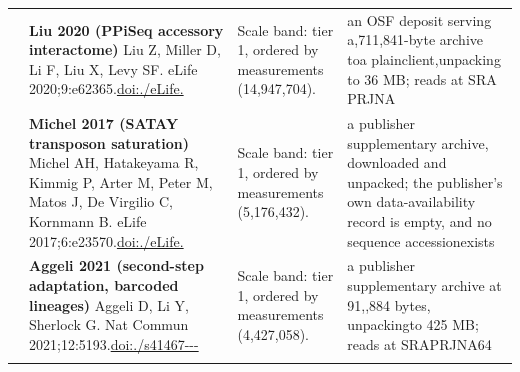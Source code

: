 \begin{landscape}
\begin{longtable}{@{}r@{\hspace{4pt}} L{78mm} L{72mm} L{76mm}@{}}
 & \textbf{Liu 2020 (PPiSeq accessory interactome)} \newline Liu Z, Miller D, Li F, Liu X, Levy SF. eLife 2020;9:e62365.\newline \href{https://doi.org/10.7554/eLife.62365}{doi:./\allowbreak eLife.} & Scale band: tier 1, ordered by measurements (14,947,704). & an OSF d\allowbreak eposit s\allowbreak erving a,711\allowbreak ,841-\allowbreak byte ar\allowbreak chive to\allowbreak  a plain\allowbreak  client,\allowbreak  unpacki\allowbreak ng to 36 MB; re\allowbreak ads at S\allowbreak RA PRJNA \\
 & \textbf{Michel 2017 (SATAY transposon saturation)} \newline Michel AH, Hatakeyama R, Kimmig P, Arter M, Peter M, Matos J, De Virgilio C, Kornmann B. eLife 2017;6:e23570.\newline \href{https://doi.org/10.7554/eLife.23570}{doi:./\allowbreak eLife.} & Scale band: tier 1, ordered by measurements (5,176,432). & a publis\allowbreak her supp\allowbreak lementar\allowbreak y archiv\allowbreak e, downl\allowbreak oaded an\allowbreak d unpack\allowbreak ed; the \allowbreak publishe\allowbreak r's own \allowbreak data-\allowbreak availab\allowbreak ility re\allowbreak cord is \allowbreak empty, a\allowbreak nd no se\allowbreak quence a\allowbreak ccession\allowbreak  exists \\
 & \textbf{Aggeli 2021 (second-step adaptation, barcoded lineages)} \newline Aggeli D, Li Y, Sherlock G. Nat Commun 2021;12:5193.\newline \href{https://doi.org/10.1038/s41467-021-25440-7}{doi:./\allowbreak s41467---} & Scale band: tier 1, ordered by measurements (4,427,058). & a publis\allowbreak her supp\allowbreak lementar\allowbreak y archiv\allowbreak e at 91,,884 \allowbreak bytes, u\allowbreak npacking\allowbreak  to 425 \allowbreak MB; read\allowbreak s at SRA\allowbreak  PRJNA64 \\
\addlinespace[5pt]

\end{longtable}
\end{landscape}
